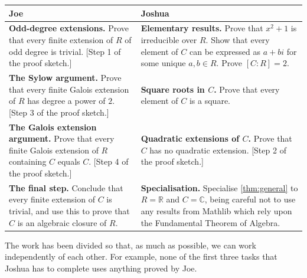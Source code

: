 \documentclass{article}
\begin{document}
{\small
\begin{tabularx}{\textwidth}{@{}L@{\hspace{2em}}L@{}}
\toprule
\textbf{Joe} & \textbf{Joshua} \\
\midrule
\textbf{Odd-degree extensions.}
Prove that every finite extension of $R$ of odd degree is trivial. [Step 1 of the proof sketch.]
&
\textbf{Elementary results.}
Prove that $x^2+1$ is irreducible over $R$. Show that every element of $C$ can be expressed as $a+bi$ for some unique $a,b\in R$. Prove $[C:R]=2$.
\\ \addlinespace
\textbf{The Sylow argument.}
Prove that every finite Galois extension of $R$ has degree a power of $2$. [Step 3 of the proof sketch.]
&
\textbf{Square roots in $C$.}
Prove that every element of $C$ is a square.
\\ \addlinespace
\textbf{The Galois extension argument.}
Prove that every finite Galois extension of $R$ containing $C$ equals $C$. [Step 4 of the proof sketch.]
&
\textbf{Quadratic extensions of $C$.}
Prove that $C$ has no quadratic extension. [Step 2 of the proof sketch.]
\\ \addlinespace
\textbf{The final step.}
Conclude that every finite extension of $C$ is trivial, and use this to prove that $C$ is an algebraic closure of $R$.
&
\textbf{Specialisation.}
Specialise \cref{thm:general} to $R=\mathbb R$ and $C=\mathbb C$, being careful not to use any results from Mathlib which rely upon the Fundamental Theorem of Algebra.
\\
\bottomrule
\end{tabularx}\par
}

The work has been divided so that, as much as possible, we can work independently of each other. For example, none of the first three tasks that Joshua has to complete uses anything proved by Joe.
\end{document}
